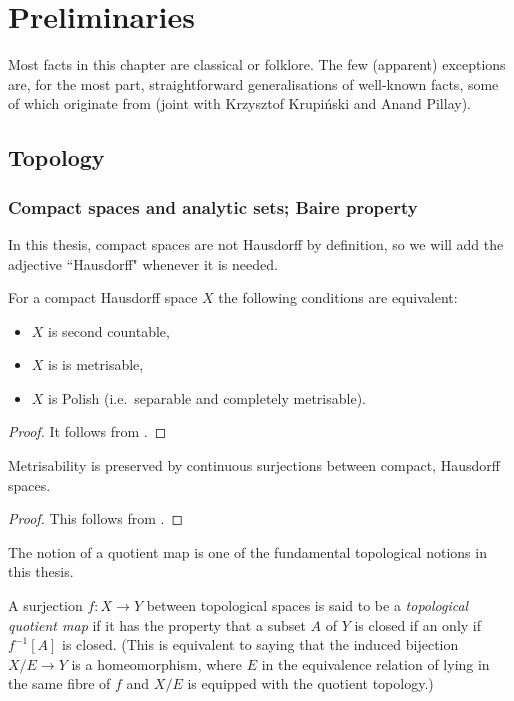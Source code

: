 
	

	\chapter{Preliminaries}
	\label{chap:prelims}
	Most facts in this chapter are classical or folklore. The few (apparent) exceptions are, for the most part, straightforward generalisations of well-known facts, some of which originate from \cite{KPR15} (joint with Krzysztof Krupiński and Anand Pillay).
	\section{Topology}
	
	\subsection*{Compact spaces and analytic sets; Baire property}
	In this thesis, compact spaces are not Hausdorff by definition, so we will add the adjective ``Hausdorff" whenever it is needed.
	
	\begin{fct}
		For a compact Hausdorff space $X$ the following conditions are equivalent:
		\begin{itemize}
			\item $X$ is second countable,
			\item $X$ is is metrisable,
			\item $X$ is Polish (i.e.\ separable and completely metrisable).
		\end{itemize}
	\end{fct}
	\begin{proof}
		It follows from \cite[Theorem 5.3]{Kec95}.
	\end{proof}
	
	\begin{fct}\label{fct: preservation of metrizability}
		Metrisability is preserved by continuous surjections between compact, Hausdorff spaces.
	\end{fct}
	\begin{proof}
		This follows from \cite[Theorem 4.4.15]{Eng89}.
	\end{proof}
	The  notion of a quotient map is one of the fundamental topological notions in this thesis.
	\begin{dfn}
		A surjection $f \colon X \to Y$ between topological spaces is said to be a {\em topological quotient map} if it has the property that a subset $A$ of $Y$ is closed if an only if $f^{-1}[A]$ is closed. (This is equivalent to saying that the induced bijection $X/E \to Y$ is a homeomorphism, where $E$ in the equivalence relation of lying in the same fibre of $f$ and $X/E$ is equipped with the quotient topology.)
		\xqed{\lozenge}
	\end{dfn}
	
